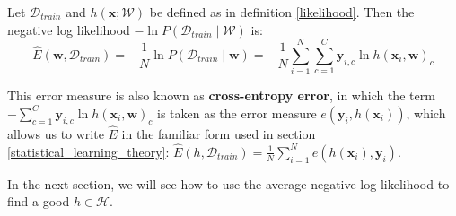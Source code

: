 \begin{definition}
	\label{negative_log-likelihood}
	Let $\mathcal{D}_{train}$ and $h(\mathbf{x}; \mathcal{W})$ be defined as in definition \ref{likelihood}. Then the negative log likelihood $-\ln P(\mathcal{D}_{train} \mid \mathcal{W})$ is:
	$$
	\hat{E}(\mathbf{w}, \mathcal{D}_{train}) = - \frac{1}{N}\ln P(\mathcal{D}_{train} \mid \mathbf{w}) = - \frac{1}{N}\sum\limits_{i=1}^N\sum\limits_{c=1}^C \mathbf{y}_{i,c} \ln h(\mathbf{x}_i, \mathbf{w})_c
	$$
\end{definition}
This error measure is also known as \textbf{cross-entropy error}, in which the term $-\sum_{c=1}^C \mathbf{y}_{i,c} \ln h(\mathbf{x}_i, \mathbf{w})_c$ is taken as the error measure $e(\mathbf{y}_i, h(\mathbf{x}_i))$, which allows us to write $\hat{E}$ in the familiar form used in section \ref{statistical_learning_theory}: $\hat{E}(h, \mathcal{D}_{train}) = \frac{1}{N}\sum_{i=1}^N e(h(\mathbf{x}_i), \mathbf{y}_i)$.

In the next section, we will see how to use the average negative log-likelihood to find a good $h \in \mathcal{H}$.
